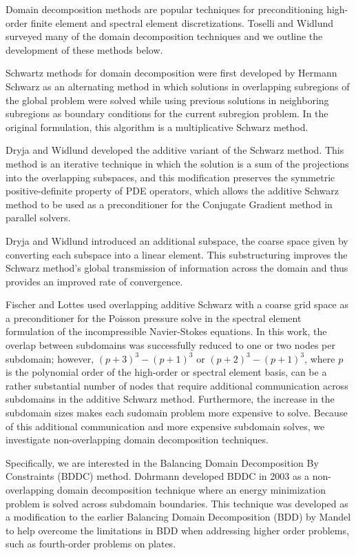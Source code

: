 Domain decomposition methods are popular techniques for preconditioning high-order finite element and spectral element discretizations.
Toselli and Widlund surveyed many of the domain decomposition techniques \cite{toselli2005domain} and we outline the development of these methods below.

Schwartz methods for domain decomposition were first developed by Hermann Schwarz \cite{schwarz1972gesammelte} as an alternating method in which solutions in overlapping subregions of the global problem were solved while using previous solutions in neighboring subregions as boundary conditions for the current subregion problem.
In the original formulation, this algorithm is a multiplicative Schwarz method.

Dryja and Widlund \cite{widlund1987additive,dryja1989additive} developed the additive variant of the Schwarz method.
This method is an iterative technique in which the solution is a sum of the projections into the overlapping subspaces, and this modification preserves the symmetric positive-definite property of PDE operators, which allows the additive Schwarz method to be used as a preconditioner for the Conjugate Gradient method in parallel solvers.

Dryja and Widlund introduced an additional subspace, the coarse space given by converting each subspace into a linear element.
This substructuring improves the Schwarz method's global transmission of information across the domain and thus provides an improved rate of convergence. 

Fischer and Lottes \cite{fischer1997overlapping,fischer2005hybrid} used overlapping additive Schwarz with a coarse grid space as a preconditioner for the Poisson pressure solve in the spectral element formulation of the incompressible Navier-Stokes equations.
In this work, the overlap between subdomains was successfully reduced to one or two nodes per subdomain; however, $\left( p + 3 \right)^3 - \left( p + 1 \right)^3$ or $\left( p + 2 \right)^3 - \left( p + 1 \right)^3$, where $p$ is the polynomial order of the high-order or spectral element basis, can be a rather substantial number of nodes that require additional communication across subdomains in the additive Schwarz method.
Furthermore, the increase in the subdomain sizes makes each sudomain problem more expensive to solve.
Because of this additional communication and more expensive subdomain solves, we investigate non-overlapping domain decomposition techniques.

Specifically, we are interested in the Balancing Domain Decomposition By Constraints (BDDC) method.
Dohrmann \cite{dohrmann2003preconditioner} developed BDDC in 2003 as a non-overlapping domain decomposition technique where an energy minimization problem is solved across subdomain boundaries.
This technique was developed as a modification to the earlier Balancing Domain Decomposition (BDD) by Mandel \cite{mandel1993balancing} to help overcome the limitations in BDD when addressing higher order problems, such as fourth-order problems on plates.

